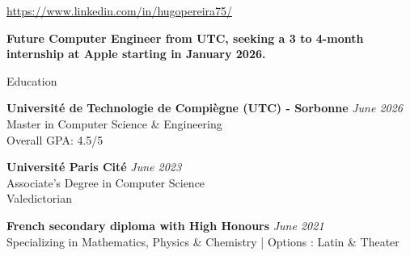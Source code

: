 \documentclass[
	10pt,
]{style} %
\begin{document}
\begin{center}
	\url{https://www.linkedin.com/in/hugopereira75/}
\end{center}

\begin{center}
	\textbf{Future Computer Engineer from UTC, seeking a 3 to 4-month internship at Apple starting in January 2026.}
\end{center}


\begin{rSection}{Education}
	
	\textbf{Université de Technologie de Compiègne (UTC) - Sorbonne} \hfill \textit{June 2026} \\
	Master in Computer Science \& Engineering \\
	Overall GPA: 4.5/5

	\textbf{Université Paris Cité} \hfill \textit{June 2023} \\
	Associate's Degree in Computer Science \\
	Valedictorian

	\textbf{French secondary diploma with High Honours} \hfill \textit{June 2021} \\
	Specializing in Mathematics, Physics \& Chemistry | Options : Latin \& Theater \\

\end{rSection}

\end{document}
